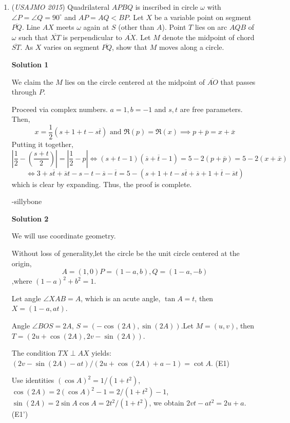 \begin{enumerate}
 Using substitution we get the solutions: $(n^3 + 3n^2 - 1, - n^3 + 3n + 1) \cup ( - n^3 + 3n + 1, n^3 + 3n^2 - 1)$



	\item (\textit{USAJMO 2015}) Quadrilateral $APBQ$ is inscribed in circle $\omega$ with $\angle P = \angle Q = 90^{\circ}$ and $AP = AQ < BP$. Let $X$ be a variable point on segment $\overline{PQ}$. Line $AX$ meets $\omega$ again at $S$ (other than $A$). Point $T$ lies on arc $AQB$ of $\omega$ such that $\overline{XT}$ is perpendicular to $\overline{AX}$. Let $M$ denote the midpoint of chord $\overline{ST}$. As $X$ varies on segment $\overline{PQ}$, show that $M$ moves along a circle.


 



\textbf{Solution 1}

We claim the $M$ lies on the circle centered at the midpoint of $\overline{AO}$ that passes through $P$. 

 Proceed via complex numbers. $a=1, b=-1$ and $s, t$ are free parameters. Then, 
 \[x = \frac{1}{2} (s+1+t-s\overline{t}) \text{ and } \Re (p) = \Re (x) \implies p+\overline{p}=x+\overline{x}\] Putting it together, 
 \[\left| \frac{1}{2}-\left(\frac{s+t}{2}\right) \right| = \left| \frac{1}{2} - p \right| \iff (s+t-1)(\overline{s}+\overline{t}-1) = 5-2(p+\overline{p}) = 5 - 2(x+\overline{x})\] 
 \[\iff 3+s\overline{t}+\overline{s}t-s-t-\overline{s}-\overline{t}=5-(s+1+t-s\overline{t}+\overline{s}+1+\overline{t}-\overline{s}t)\] which is clear by expanding. Thus, the proof is complete.

 -sillybone

 



\textbf{Solution 2}

We will use coordinate geometry.

 Without loss of generality,let the circle be the unit circle centered at the origin, 
 \[A=(1,0) P=(1-a,b), Q=(1-a,-b)\],where $(1-a)^2+b^2=1$.

 Let angle $\angle XAB=A$, which is an acute angle, $\tan{A}=t$, then $X=(1-a,at)$.

 Angle $\angle BOS=2A$, $S=(-\cos(2A),\sin(2A))$.Let $M=(u,v)$, then $T=(2u+\cos(2A), 2v-\sin(2A))$.

 The condition $TX \perp AX$ yields: $(2v-\sin(2A)-at)/(2u+\cos(2A)+a-1)=\cot A.$     (E1)

 Use identities $(\cos A)^2=1/(1+t^2)$,  $\cos(2A)=2(\cos A)^2-1= 2/(1+t^2) -1$, $\sin(2A)=2\sin A\cos A=2t^2/(1+t^2)$, we obtain $2vt-at^2=2u+a$.   (E1')


\end{enumerate}
